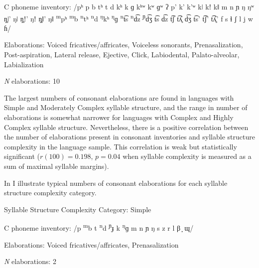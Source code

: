 \ea\label{ex:4.27}
\begin{Coding}
\item[C phoneme inventory:]  /pʰ p b tʰ t d kʰ k ɡ kʰʷ kʷ ɡʷ ʔ p’ k’ k’ʷ kǀ kǃ kǁ m n ɲ ŋ ŋʷ ŋ̥ǀ’ ŋǀ ŋ̥ǃ’ ŋǃ ŋ̥ǁ’ ŋǁ \textsuperscript{m}pʰ \textsuperscript{m}b \textsuperscript{n}tʰ \textsuperscript{n}d \textsuperscript{ŋ}kʰ \textsuperscript{ŋ}ɡ \textsuperscript{n}t͡s \textsuperscript{n}d͡z \textsuperscript{ɲ}d͡ʒ t͡s d͡z t͡ʃ t͡ʎ̥ d͡ʒ t͡s’ t͡ʃ’ t͡ʎ̥’ f s ɬ ʃ l j w ɦ/

\item[Elaborations:] Voiced fricatives/affricates, Voiceless sonorants, Prenasalization, Post-aspiration, Lateral release, Ejective, Click, Labiodental, Palato-alveolar, Labialization

\item[\textit{N} elaborations:] 10
\end{Coding}
\z

  The largest numbers of consonant elaborations are found in languages with Simple and Moderately Complex syllable structure, and the range in number of elaborations is somewhat narrower for languages with Complex and Highly Complex syllable structure. Nevertheless, there is a positive correlation between the number of elaborations present in consonant inventories and syllable structure complexity in the language sample. This correlation is weak but statistically significant ($r(100) = 0.198$, $p = 0.04$ when syllable complexity is measured as a sum of maximal syllable margins).

  In  I illustrate typical numbers of consonant elaborations for each syllable structure complexity category.

\ea\label{ex:4.28}
\begin{Coding}
\item[Syllable Structure Complexity Category:] Simple

\item[C phoneme inventory:] /p \textsuperscript{m}b t \textsuperscript{n}d \textsuperscript{ɲ}ɟ k \textsuperscript{ŋ}ɡ m n ɲ ŋ s z r l β ̞ ɰ/

\item[Elaborations:] Voiced fricatives/affricates, Prenasalization

\item[\textit{N} elaborations:] 2
\end{Coding}
\z

